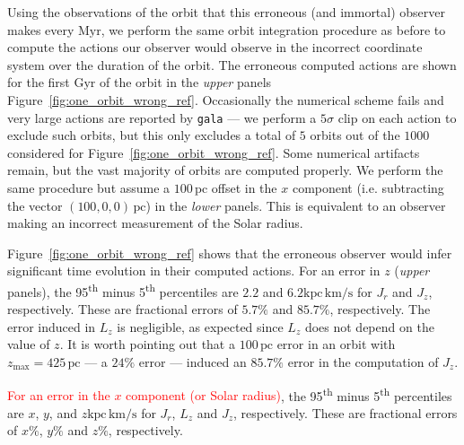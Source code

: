 \documentclass[twocolumn]{aastex62}
\newcommand{\Gus}[1]{\textcolor{red}{#1}}
\newcommand{\pc}{\text{pc}}
\newcommand{\Myr}{\text{Myr}}
\newcommand{\Gyr}{\text{Gyr}}
\newcommand{\kms}{\text{km}/\text{s}}
\newcommand{\actunit}{\text{kpc}\,\kms}
\begin{document}
Using the observations of the orbit that this erroneous (and immortal)
observer makes every $\Myr$, we perform the same orbit integration procedure
as before to compute the actions our observer would observe in the incorrect
coordinate system over the duration of the orbit. The erroneous computed
actions are shown for the first $\Gyr$ of the orbit in the {\em upper} panels
Figure~\ref{fig:one_orbit_wrong_ref}. Occasionally the numerical scheme fails
and very large actions are reported by \texttt{gala}
--- we perform a $5\sigma$ clip on each action to exclude such orbits, but
    this only excludes a total of $5$ orbits out of the $1000$ considered for
    Figure~\ref{fig:one_orbit_wrong_ref}. Some numerical artifacts remain, but
    the vast majority of orbits are computed properly. We perform the same
    procedure but assume a $100\,\pc$ offset in the $x$ component (i.e.
    subtracting the vector $(100, 0, 0)\,\pc$) in the {\em lower} panels. This
    is equivalent to an observer making an incorrect measurement of the Solar
    radius.

Figure~\ref{fig:one_orbit_wrong_ref} shows that the erroneous observer would
infer significant time evolution in their computed actions. For an error in
$z$ ({\em upper} panels), the 95\textsuperscript{th} minus
5\textsuperscript{th} percentiles are $2.2$ and $6.2 \actunit$ for $J_r$ and
$J_z$, respectively. These are fractional errors of $5.7\%$ and $85.7\%$,
respectively. The error induced in $L_z$ is negligible, as expected since
$L_z$ does not depend on the value of $z$. It is worth pointing out that a
$100\,\pc$ error in an orbit with $z_{\text{max}}=425\,\pc$ --- a $24\%$ error
--- induced an $85.7\%$ error in the computation of $J_z$.

\Gus{For an error in the $x$ component (or Solar radius)}, the
95\textsuperscript{th} minus 5\textsuperscript{th} percentiles are $x$, $y$,
and $z \actunit$ for $J_r$, $L_z$ and $J_z$, respectively. These are
fractional errors of $x\%$, $y\%$ and $z\%$, respectively.
\end{document}
